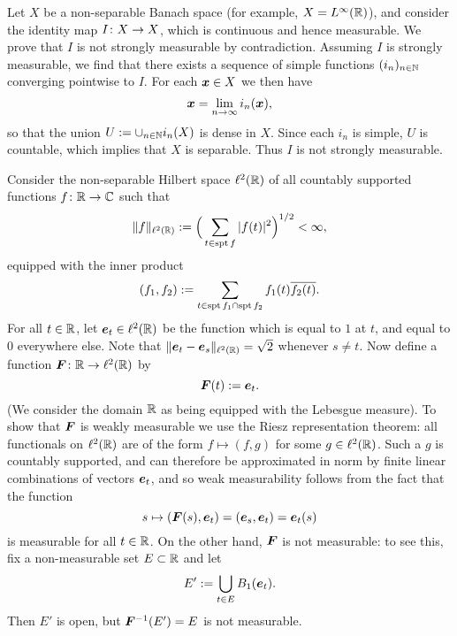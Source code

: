 \begin{example}\label{eg:non-sm}
  Let $X$ be a non-separable Banach space (for example, $X = L^\infty(\mathbb{R})$), and consider the identity map $I \colon X \rightarrow X$, which is continuous and hence measurable.
  We prove that $I$ is not strongly measurable by contradiction.
  Assuming $I$ is strongly measurable, we find that there exists a sequence of simple functions $(i_n)_{n \in \mathbb{N}}$ converging pointwise to $I$.
  For each $\bm{x} \in X$ we then have
  \begin{equation*}
    \bm{x} = \lim_{n \to \infty} i_n(\bm{x}),
  \end{equation*}
  so that the union $U := \cup_{n \in \mathbb{N}} i_n(X)$ is dense in $X$.
  Since each $i_n$ is simple, $U$ is countable, which implies that $X$ is separable.
  Thus $I$ is not strongly measurable.
\end{example}

\begin{example}\label{eg:non-meas}
  Consider the non-separable Hilbert space $\ell^2(\mathbb{R})$ of all countably supported functions $f \colon \mathbb{R} \rightarrow \mathbb{C}$ such that
  \begin{equation*}
    \|f\|_{\ell^{2}(\mathbb{R})} := \Big( \sum_{t \in \operatorname{spt} f} |f(t)|^2 \Big)^{1/2} < \infty,
  \end{equation*}
  equipped with the inner product
  \begin{equation*}
    (f_1, f_2 ) := \sum_{t \in \operatorname{spt} f_1 \cap \operatorname{spt} f_2} f_1(t) \overline{f_2(t)}.
  \end{equation*} 
  For all $t \in \mathbb{R}$, let $\bm{e}_{t} \in \ell^2(\mathbb{R})$ be the function which is equal to $1$ at $t$, and equal to $0$ everywhere else.
  Note that $\|\bm{e}_{t} - \bm{e}_{s}\|_{\ell^2(\mathbb{R})} = \sqrt{2}$ whenever $s \neq t$.
  Now define a function $\bm{F} \colon \mathbb{R} \rightarrow \ell^2(\mathbb{R})$ by
  \begin{equation*}
    \bm{F}(t) := \bm{e}_{t}.
  \end{equation*}
  (We consider the domain $\mathbb{R}$ as being equipped with the Lebesgue measure).
  To show that $\bm{F}$ is weakly measurable we use the Riesz representation theorem: all functionals on $\ell^2(\mathbb{R})$ are of the form $f \mapsto ( f, g )$ for some $g \in \ell^2(\mathbb{R})$.
  Such a $g$ is countably supported, and can therefore be approximated in norm by finite linear combinations of vectors $\bm{e}_{t}$, and so weak measurability follows from the fact that the function
  \begin{equation*}
    s \mapsto ( \bm{F}(s), \bm{e}_{t} )  = (\bm{e}_{s}, \bm{e}_{t}) = \bm{e}_{t}(s)
  \end{equation*}
  is measurable for all $t \in \mathbb{R}$.
  On the other hand, $\bm{F}$ is not measurable: to see this, fix a non-measurable set $E \subset \mathbb{R}$ and let
  \begin{equation*}
    E' := \bigcup_{t \in E} B_{1}(\bm{e}_{t}).
  \end{equation*}
  Then $E'$ is open, but $\bm{F}^{-1}( E' ) = E$ is not measurable.
\end{example}

